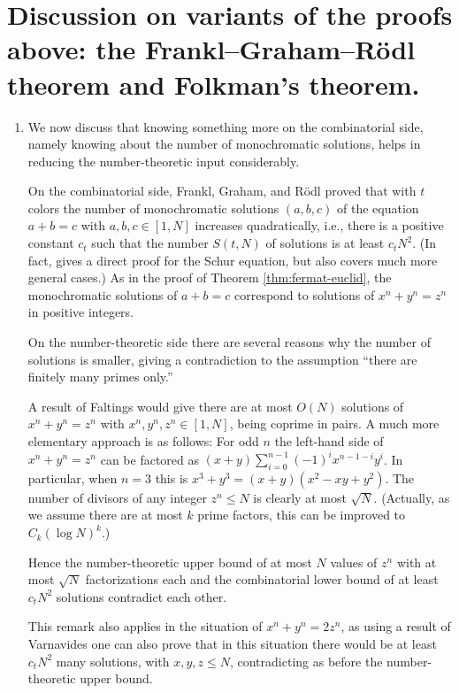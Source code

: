 \documentclass{article}
\theoremstyle{theorem}
\theoremstyle{definition}
\begin{document}
\section{Discussion on variants of the proofs above:
  the Frankl--Graham--R\"{o}dl theorem and
  Folkman's theorem.}
{\label{sec:discussion}}
\begin{enumerate}
\item 
We now discuss that knowing something more on the combinatorial side,
namely knowing about the number of monochromatic 
solutions, helps in reducing the number-theoretic input considerably.

On the combinatorial side, 
Frankl, Graham, and R\"odl \cite{Frankl-Graham-Rodl:1988} proved 
that with $t$ colors the number of monochromatic solutions 
$(a,b,c)$ of the equation $a+b=c$  with $a,b,c \in [1,N]$ increases
quadratically, i.e., there is a positive constant 
$c_t$ such that the number $S(t,N)$ of solutions is at least $c_t N^2$.
(In fact, \cite{Frankl-Graham-Rodl:1988}
gives a direct proof for the Schur equation, 
but also covers much more general cases.)
As in the proof of Theorem \ref{thm:fermat-euclid},
the monochromatic solutions of $a+b=c$
correspond to solutions of $x^n+y^n=z^n$ in positive integers.

On the number-theoretic side there are several reasons why the number of
solutions is smaller, giving a contradiction to the assumption ``there are 
finitely many primes only.''

A result of Faltings \cite{Faltings:1983} would give there are at most $O(N)$ 
solutions of $x^n+y^n=z^n$ with $x^n,y^n,z^n\in [1,N]$, being coprime in pairs.
A much more elementary approach is as follows:
For odd $n$ the left-hand side of $x^n+y^n=z^n$ can be factored as 
$(x+y)\sum_{i=0}^{n-1}(-1)^ix^{n-1-i}y^i$. In particular, when
$n=3$ this is $x^3+y^3=(x+y)(x^2-xy+y^2)$.
The number of divisors of any
integer $z^n \leq N$ is clearly at most $\sqrt{N}$. (Actually, as we assume
there are at most $k$ prime factors, this can be improved to $C_k (\log N)^k$.)

Hence the number-theoretic upper bound of at most $N$ values of $z^n$ 
with at most $\sqrt{N}$ factorizations each
and the combinatorial lower bound of at least $c_t N^2$ solutions
contradict each other.


This remark also applies in the situation of $x^n+y^n=2z^n$, as using a
result of Varnavides \cite{Varnavides:1959} one can also
prove that in this situation there would be at least $c_t N^2$ 
many solutions, with $x,y,z\leq N$, contradicting as before the 
number-theoretic upper bound.


\end{enumerate}
\end{document}

